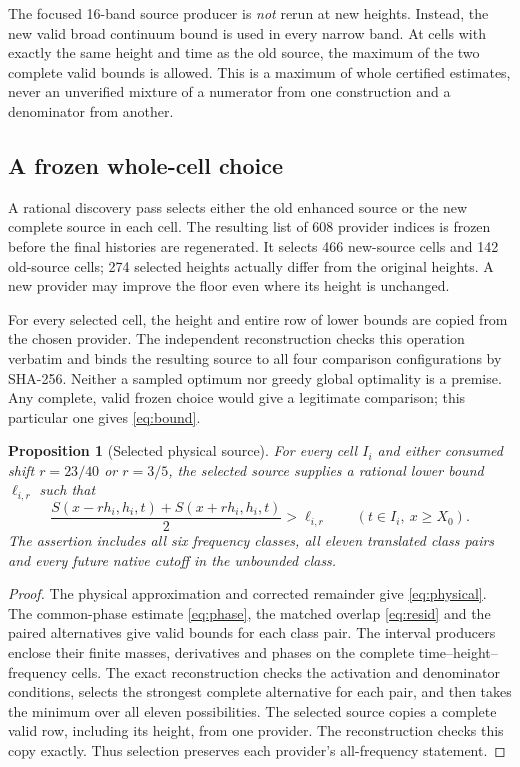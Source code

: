 \documentclass[11pt,a4paper]{article}
\newtheorem{proposition}[theorem]{Proposition}
\theoremstyle{definition}\newtheorem{definition}[theorem]{Definition}
\theoremstyle{remark}\newtheorem{remark}[theorem]{Remark}
\begin{document}
The focused 16-band source producer is \emph{not} rerun at new heights.
Instead, the new valid broad continuum bound is used in every narrow
band. At cells with exactly the same height and time as the old source,
the maximum of the two complete valid bounds is allowed. This is a
maximum of whole certified estimates, never an unverified mixture of a
numerator from one construction and a denominator from another.

\subsection{A frozen whole-cell choice}
A rational discovery pass selects either the old enhanced source or the
new complete source in each cell. The resulting list of 608 provider
indices is frozen before the final histories are regenerated. It selects
466 new-source cells and 142 old-source cells; 274 selected heights
actually differ from the original heights. A new provider may improve
the floor even where its height is unchanged.

For every selected cell, the height and entire row of lower bounds are
copied from the chosen provider. The independent reconstruction checks
this operation verbatim and binds the resulting source to all four
comparison configurations by SHA-256. Neither a sampled optimum nor
greedy global optimality is a premise. Any complete, valid frozen choice
would give a legitimate comparison; this particular one gives
\eqref{eq:bound}.


\begin{proposition}[Selected physical source]\label{prop:source}
For every cell $I_i$ and either consumed shift $r=23/40$ or $r=3/5$,
the selected source supplies a rational lower bound $\ell_{i,r}$ such that
\[
 \frac{S(x-rh_i,h_i,t)+S(x+rh_i,h_i,t)}2>\ell_{i,r}
 \qquad(t\in I_i,\ x\ge X_0).
\]
The assertion includes all six frequency classes, all eleven translated
class pairs and every future native cutoff in the unbounded class.
\end{proposition}
\begin{proof}
The physical approximation and corrected remainder give
\eqref{eq:physical}. The common-phase estimate \eqref{eq:phase}, the
matched overlap \eqref{eq:resid} and the paired alternatives give valid
bounds for each class pair. The interval producers enclose their finite
masses, derivatives and phases on the complete time--height--frequency
cells. The exact reconstruction checks the activation and denominator
conditions, selects the strongest complete alternative for each pair,
and then takes the minimum over all eleven possibilities.
The selected source copies a complete valid row, including its height,
from one provider. The reconstruction checks this copy exactly.
Thus selection preserves each provider's all-frequency statement.
\end{proof}
\end{document}
